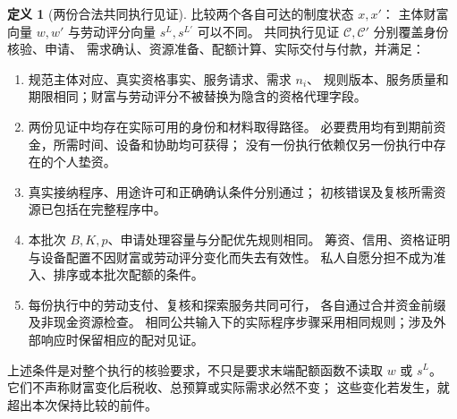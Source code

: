 \documentclass[UTF8,12pt,a4paper,openany,fontset=none,zihao=false]{ctexrep}
\theoremstyle{definition}
\newtheorem{definition}{定义}[chapter]
\newcommand{\1}{\mathbf 1}
\begin{document}
\begin{definition}[两份合法共同执行见证]
\label{access:paired-witness}
比较两个各自可达的制度状态 \(x,x'\)：
主体财富向量 \(w,w'\) 与劳动评分向量 \(s^L,s^{L\prime}\) 可以不同。
共同执行见证 \(\mathcal C,\mathcal C'\) 分别覆盖身份核验、申请、
需求确认、资源准备、配额计算、实际交付与付款，并满足：
\begin{enumerate}
\item 规范主体对应、真实资格事实、服务请求、需求 \(n_i\)、
规则版本、服务质量和期限相同；财富与劳动评分不被替换为隐含的资格代理字段。
\item 两份见证中均存在实际可用的身份和材料取得路径。
必要费用均有到期前资金，所需时间、设备和协助均可获得；
没有一份执行依赖仅另一份执行中存在的个人垫资。
\item 真实接纳程序、用途许可和正确确认条件分别通过；
初核错误及复核所需资源已包括在完整程序中。
\item 本批次 \(B,K,p\)、申请处理容量与分配优先规则相同。
筹资、信用、资格证明与设备配置不因财富或劳动评分变化而失去有效性。
私人自愿分担不成为准入、排序或本批次配额的条件。
\item 每份执行中的劳动支付、复核和探索服务共同可行，
各自通过合并资金前缀及非现金资源检查。
相同公共输入下的实际程序步骤采用相同规则；涉及外部响应时保留相应的配对见证。
\end{enumerate}
上述条件是对整个执行的核验要求，不只是要求末端配额函数不读取 \(w\) 或 \(s^L\)。
它们不声称财富变化后税收、总预算或实际需求必然不变；
这些变化若发生，就超出本次保持比较的前件。
\end{definition}
\end{document}
